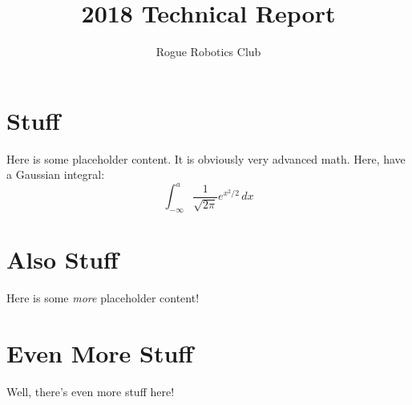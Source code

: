 \documentclass{roguedoc}
\title{2018 Technical Report}
\author{Rogue Robotics Club}
\begin{document}
\roguetoc{}

\section{Stuff}
Here is some placeholder content. It is obviously very advanced math. Here, have a Gaussian integral:
\begin{equation}
  \int _{-\infty} ^{a} \frac{1}{\sqrt{2\pi}} e^{x^2/2}\,dx
\end{equation}

\section{Also Stuff}
Here is some \emph{more} placeholder content!

\section{Even More Stuff}
Well, there's even more stuff here!
\end{document}
